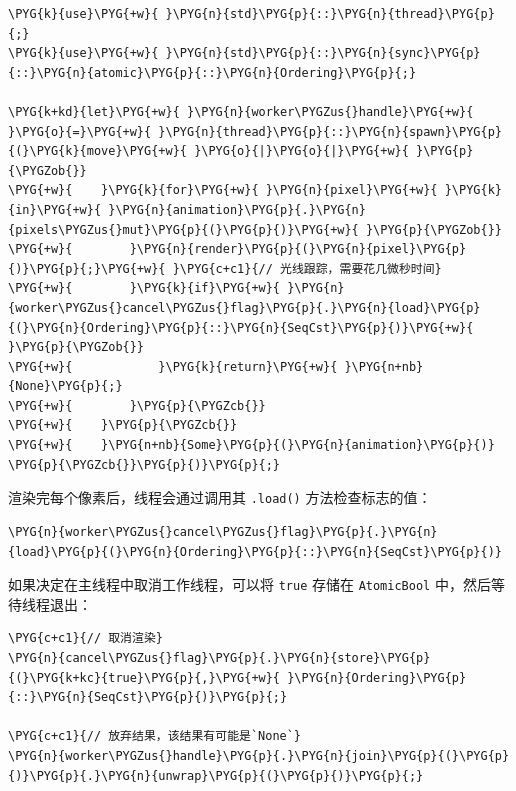 \begin{Verbatim}[commandchars=\\\{\},breaklines=true,breakanywhere=true,fontsize=\codefont,xleftmargin=17bp]
\PYG{k}{use}\PYG{+w}{ }\PYG{n}{std}\PYG{p}{::}\PYG{n}{thread}\PYG{p}{;}
\PYG{k}{use}\PYG{+w}{ }\PYG{n}{std}\PYG{p}{::}\PYG{n}{sync}\PYG{p}{::}\PYG{n}{atomic}\PYG{p}{::}\PYG{n}{Ordering}\PYG{p}{;}

\PYG{k+kd}{let}\PYG{+w}{ }\PYG{n}{worker\PYGZus{}handle}\PYG{+w}{ }\PYG{o}{=}\PYG{+w}{ }\PYG{n}{thread}\PYG{p}{::}\PYG{n}{spawn}\PYG{p}{(}\PYG{k}{move}\PYG{+w}{ }\PYG{o}{|}\PYG{o}{|}\PYG{+w}{ }\PYG{p}{\PYGZob{}}
\PYG{+w}{    }\PYG{k}{for}\PYG{+w}{ }\PYG{n}{pixel}\PYG{+w}{ }\PYG{k}{in}\PYG{+w}{ }\PYG{n}{animation}\PYG{p}{.}\PYG{n}{pixels\PYGZus{}mut}\PYG{p}{(}\PYG{p}{)}\PYG{+w}{ }\PYG{p}{\PYGZob{}}
\PYG{+w}{        }\PYG{n}{render}\PYG{p}{(}\PYG{n}{pixel}\PYG{p}{)}\PYG{p}{;}\PYG{+w}{ }\PYG{c+c1}{// 光线跟踪，需要花几微秒时间}
\PYG{+w}{        }\PYG{k}{if}\PYG{+w}{ }\PYG{n}{worker\PYGZus{}cancel\PYGZus{}flag}\PYG{p}{.}\PYG{n}{load}\PYG{p}{(}\PYG{n}{Ordering}\PYG{p}{::}\PYG{n}{SeqCst}\PYG{p}{)}\PYG{+w}{ }\PYG{p}{\PYGZob{}}
\PYG{+w}{            }\PYG{k}{return}\PYG{+w}{ }\PYG{n+nb}{None}\PYG{p}{;}
\PYG{+w}{        }\PYG{p}{\PYGZcb{}}
\PYG{+w}{    }\PYG{p}{\PYGZcb{}}
\PYG{+w}{    }\PYG{n+nb}{Some}\PYG{p}{(}\PYG{n}{animation}\PYG{p}{)}
\PYG{p}{\PYGZcb{}}\PYG{p}{)}\PYG{p}{;}
\end{Verbatim}

渲染完每个像素后，线程会通过调用其 \texttt{.load()} 方法检查标志的值：

\begin{Verbatim}[commandchars=\\\{\},breaklines=true,breakanywhere=true,fontsize=\codefont,xleftmargin=17bp]
\PYG{n}{worker\PYGZus{}cancel\PYGZus{}flag}\PYG{p}{.}\PYG{n}{load}\PYG{p}{(}\PYG{n}{Ordering}\PYG{p}{::}\PYG{n}{SeqCst}\PYG{p}{)}
\end{Verbatim}

如果决定在主线程中取消工作线程，可以将 \texttt{true} 存储在 \texttt{AtomicBool} 中，然后等待线程退出：

\begin{Verbatim}[commandchars=\\\{\},breaklines=true,breakanywhere=true,fontsize=\codefont,xleftmargin=17bp]
\PYG{c+c1}{// 取消渲染}
\PYG{n}{cancel\PYGZus{}flag}\PYG{p}{.}\PYG{n}{store}\PYG{p}{(}\PYG{k+kc}{true}\PYG{p}{,}\PYG{+w}{ }\PYG{n}{Ordering}\PYG{p}{::}\PYG{n}{SeqCst}\PYG{p}{)}\PYG{p}{;}

\PYG{c+c1}{// 放弃结果，该结果有可能是`None`}
\PYG{n}{worker\PYGZus{}handle}\PYG{p}{.}\PYG{n}{join}\PYG{p}{(}\PYG{p}{)}\PYG{p}{.}\PYG{n}{unwrap}\PYG{p}{(}\PYG{p}{)}\PYG{p}{;}
\end{Verbatim}

